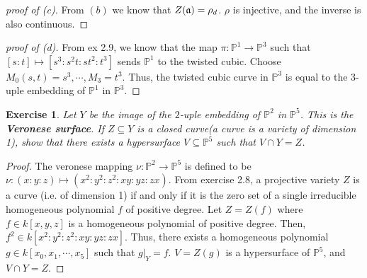 \documentclass[12pt,letterpaper]{article}
\newtheorem{problem}{Exercise}[section]
\theoremstyle{definition}
\theoremstyle{remark}
\numberwithin{equation}{section}
\numberwithin{figure}{problem}
\let\Im\relax
\DeclareMathOperator{\Im}{im}
\newcommand{\PP}{\mathbb{P}}
\begin{document}
\begin{proof}[proof of (c)]
From $(b)$ we know that $Z(\mathfrak{a}) = \Im \rho_d$. $\rho$ is injective, and the inverse is also continuous.  
\end{proof}

\begin{proof}[proof of (d)] From ex 2.9, we know that the map $\pi: \PP^1 \to \PP^3$ such that $[s:t] \mapsto [s^3: s^2t: st^2: t^3]$ sends $\PP^1$ to the twisted cubic. Choose $M_0(s,t) = s^3, \cdots, M_3 = t^3$. Thus, the twisted cubic curve in $\PP^3$ is equal to the $3$-uple embedding of $\PP^1$ in $\PP^3$. 

\end{proof}


\begin{problem} Let $Y$ be the image of the $2$-uple embedding of $\PP^2$ in $\PP^5$. This is the \textbf{Veronese surface}. If $Z \subseteq Y$ is a closed curve(a curve is a variety of dimension 1), show that there exists a hypersurface $V \subseteq \PP^5$ such that $V \cap Y = Z$. 
\end{problem}

\begin{proof}
The veronese mapping $\nu: \PP^2 \to \PP^5$ is defined to be $\nu: (x:y:z) \mapsto (x^2: y^2:z^2:xy:yz:zx)$. From exercise 2.8, a projective variety $Z$ is a curve (i.e. of dimension 1) if and only if it is the zero set of a single irreducible homogeneous polynomial $f$ of positive degree. Let $Z = Z(f)$ where $f \in k[x,y,z]$ is a homogeneous polynomial of positive degree. Then, $f^2 \in k[x^2:y^2:z^2:xy:yz:zx]$. Thus, there exists a homogeneous polynomial $g \in k[x_0, x_1, \cdots, x_5]$ such that $g|_Y = f$. $V = Z(g)$ is a hypersurface of $\PP^5$, and $V \cap Y = Z$. 
\end{proof}
\end{document}
